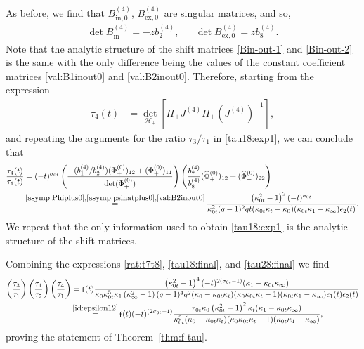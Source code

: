 \documentclass[a4paper,reqno,11pt]{amsart}
\numberwithin{equation}{section}
\numberwithin{figure}{section}
\theoremstyle{plain}
\theoremstyle{remark}
\DeclareMathOperator{\sff}{{\sf f}}
\numberwithin{rhp}{section}
\begin{document}
As before, we find that $B_{\text{in},0}^{(4)}$, $B_{\text{ex},0}^{(4)}$ are singular matrices, and so,
\begin{align}
    \det   B_{\text{in}}^{(4)} = -z b_2^{(4)}, 
    && \det   B_{\text{ex},0}^{(4)} = z b_8^{(4)}.
\end{align}
Note that the analytic structure of the shift matrices \eqref{Bin-out-1} and \eqref{Bin-out-2} is the same with the only difference being the values of the constant coefficient matrices \eqref{val:B1inout0} and \eqref{val:B2inout0}. Therefore, starting from the expression
\begin{align}
    \tau_4(t) &= \det_{\mathcal{H}_{+}} \left[\Pi_{+} J^{(4)} \Pi_{+} (J^{(4)})^{-1} \right],
\end{align}
and repeating the arguments for the ratio $\tau_3/\tau_1$ in \eqref{tau18:exp1}, we can conclude that
\begin{align}
    \frac{\tau_4(t)}{\tau_1(t)} &= (-t)^{\sigma_{0t}} \left(\frac{{ - (b_1^{(4)}/b_2^{(4)})(\Phi_{+}^{(0)})_{12} +  (\Phi_{+}^{(0)})_{11}}}{\det (\Phi_{+}^{(0)})} \right) \left( \frac{b_7^{(4)}}{b_8^{(4)}} (\widehat{\Phi}_{+}^{(0)})_{12} + (\widehat{\Phi}_{+}^{(0)})_{22}\right)\\
&\mathop{=}^{\eqref{asymp:Phiplus0},\eqref{asymp:psihatplus0},\eqref{val:B2inout0}} \frac{\left(\kappa_{0t}^2-1\right)^2 (-t)^{\sigma_{0t}}}{\kappa_{0t}^2 (q-1)^2 q t  (\kappa_{0t} \kappa_{t}-\kappa_{0}) (\kappa_{0t} \kappa_{1}-\kappa_{\infty})\epsilon_2(t)}.\label{tau28:final}
\end{align}
We repeat that the only information used to obtain \eqref{tau18:exp1} is the analytic structure of the shift matrices. 

Combining the expressions \eqref{rat:t7t8}, \eqref{tau18:final}, and \eqref{tau28:final} we find 
\begin{align}
    \left(\frac{\tau_3}{\tau_1} \right)\left(\frac{\tau_1}{\tau_2} \right) \left(\frac{\tau_4}{\tau_1} \right) &= \sff(t)\frac{\left(\kappa_{0t}^2-1\right)^4  (-t)^{2 (\sigma_{0t}-1)} (\kappa_{1}-\kappa_{0t} \kappa_{\infty})}{\kappa_{0} \kappa_{0t}^5 \kappa_{1} \left(\kappa_{\infty}^2-1\right) (q-1)^4 q^2  (\kappa_{0}-\kappa_{0t} \kappa_{t}) (\kappa_{0} \kappa_{0t} \kappa_{t}-1) (\kappa_{0t} \kappa_{1}-\kappa_{\infty}) \epsilon_1(t) \epsilon_2(t)}\\
    &\mathop{=}^{\eqref{id:epsilon12}} \sff(t)  (-t)^{(2\sigma_{0t}-1)}\frac{r_{0t}  \kappa_{0} \left(\kappa_{0t}^2-1\right)^2 \kappa_t   (\kappa_{1}-\kappa_{0t} \kappa_{\infty})}{\kappa_{0t}^3 (\kappa_{0}-\kappa_{0t} \kappa_t) (\kappa_{0} \kappa_{0t} \kappa_t-1) (\kappa_{0t} \kappa_{1}-\kappa_{\infty})},
\end{align}
proving the statement of Theorem~\ref{thm:f-tau}.
\end{document}
